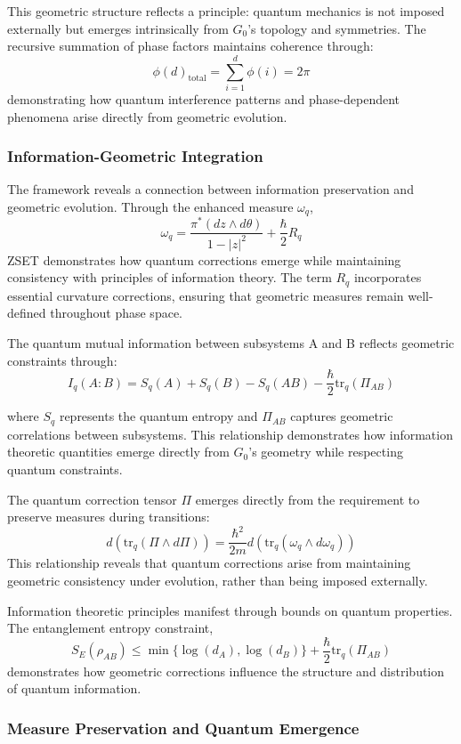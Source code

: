 \documentclass[10pt]{article}
\begin{document}
This geometric structure reflects a principle: quantum mechanics is not imposed externally but emerges intrinsically from \(G_0\)'s topology and symmetries. The recursive summation of phase factors maintains coherence through:
\[
\phi(d)_{\text{total}} = \sum_{i=1}^d \phi(i) = 2\pi
\]
demonstrating how quantum interference patterns and phase-dependent phenomena arise directly from geometric evolution.

\subsubsection{Information-Geometric Integration}

The framework reveals a connection between information preservation and geometric evolution. Through the enhanced measure \(\omega_q\),
\[
\omega_q = \frac{\pi^*(dz \wedge d\theta)}{1 - |z|^2} + \frac{\hbar}{2}R_q
\]
ZSET demonstrates how quantum corrections emerge while maintaining consistency with principles of information theory. The term \(R_q\) incorporates essential curvature corrections, ensuring that geometric measures remain well-defined throughout phase space.

The quantum mutual information between subsystems A and B reflects geometric constraints through:
\[
I_q(A:B) = S_q(A) + S_q(B) - S_q(AB) - \frac{\hbar}{2}\text{tr}_q(\Pi_{AB})
\]

where $S_q$ represents the quantum entropy and $\Pi_{AB}$ captures geometric correlations between subsystems. This relationship demonstrates how information theoretic quantities emerge directly from $G_0$'s geometry while respecting quantum constraints.

The quantum correction tensor \(\Pi\) emerges directly from the requirement to preserve measures during transitions:
\[
d(\text{tr}_q(\Pi \wedge d\Pi)) = \frac{\hbar^2}{2m}d(\text{tr}_q(\omega_q \wedge d\omega_q))
\]
This relationship reveals that quantum corrections arise from maintaining geometric consistency under evolution, rather than being imposed externally.

Information theoretic principles manifest through bounds on quantum properties. The entanglement entropy constraint,
\[
S_E(\rho_{AB}) \leq \min\{\log(d_A), \log(d_B)\} + \frac{\hbar}{2}\text{tr}_q(\Pi_{AB})
\]
demonstrates how geometric corrections influence the structure and distribution of quantum information.

\subsubsection{Measure Preservation and Quantum Emergence}
\end{document}
